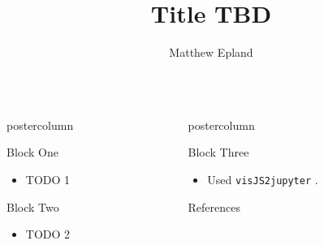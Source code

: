 \documentclass{beamer}
\title{\Huge Title TBD}
\author{Matthew Epland}
\institute[Duke]{Duke University}
\newcommand{\includedir}{../latex_files}
\newlength{\columnheight}
\begin{document}
\begin{frame}
\vspace{2.5cm} %
\begin{columns}
\begin{column}{.57\textwidth}
\begin{beamercolorbox}[center]{postercolumn}
\begin{minipage}{.98\textwidth}  %
\parbox[t][\columnheight]{\textwidth}{ %

  \begin{myblock}{Block One}
    \begin{itemize}
      \item TODO 1
    \end{itemize}
  \end{myblock}\vfill

  \begin{myblock}{Block Two}
    \begin{itemize}
      \item TODO 2
    \end{itemize}
  \end{myblock}\vfill

}\end{minipage}\end{beamercolorbox}
\end{column}

\begin{column}{.43\textwidth}
\begin{beamercolorbox}[center]{postercolumn}
\begin{minipage}{.98\textwidth}
\parbox[t][\columnheight]{\textwidth}{

  \begin{myblock}{Block Three}
    \begin{itemize}
      \item Used \texttt{visJS2jupyter} \cite{visJS2jupyter}.
    \end{itemize}
  \end{myblock}\vfill

  \begin{myblock}{References}
    
    {\footnotesize
      
    }
  \end{myblock}\vfill

}\end{minipage}\end{beamercolorbox}
\end{column}

\end{columns}
\end{frame}
\end{document}
